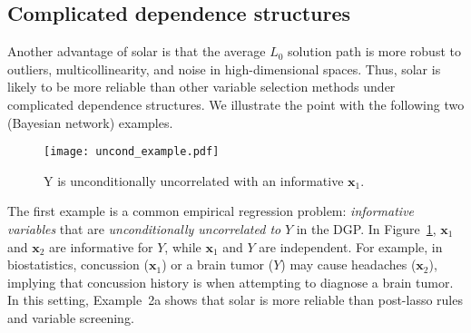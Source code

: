 \documentclass[11pt,review,authoryear]{elsarticle}
\begin{document}
\subsection{Complicated dependence structures\label{section:example}}

Another advantage of solar is that the average $L_0$ solution path is more robust to outliers, multicollinearity, and noise in high-dimensional spaces. Thus, solar is likely to be more reliable than other variable selection methods under complicated dependence structures. We illustrate the point with the following two (Bayesian network) examples.

\begin{figure}[ht]
%
  \centering
  \texttt{[image: uncond\_example.pdf]}
  \caption{Y is unconditionally uncorrelated with an informative $\mathbf{x}_1$.}
  \label{fig:uncond_example}
%
\end{figure}

The first example is a common empirical regression problem: \emph{informative variables} that are \emph{unconditionally uncorrelated to} $Y$ in the DGP. In Figure~\ref{fig:uncond_example}, $\mathbf{x}_1$ and $\mathbf{x}_2$ are informative for $Y$, while $\mathbf{x}_1$ and $Y$ are independent. For example, in biostatistics, concussion ($\mathbf{x}_1$) or a brain tumor ($Y$) may cause headaches ($\mathbf{x}_2$), implying that concussion history is when attempting to diagnose a brain tumor. In this setting, Example~2a shows that solar is more reliable than post-lasso rules and variable screening.
\end{document}
